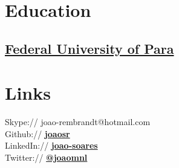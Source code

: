 \documentclass[]{joaosoares-resume}
\begin{document}
\lastupdated



\begin{minipage}[t]{0.35\textwidth} 


\section{Education}

\subsection{\href{http://www.portal.ufpa.br/}{Federal University of Para}}
\sectionsep


\section{Links} 
Skype:// joao-rembrandt@hotmail.com \\
Github:// \href{https://github.com/joaosr}{\bf joaosr} \\
LinkedIn://  \href{https://www.linkedin.com/in/joao-soares}{\bf joao-soares} \\
Twitter://  \href{https://twitter.com/joao_mnl}{\bf @joao\underline{\hspace{.10in}}mnl}\\
\sectionsep


\end{minipage}
\end{document}
